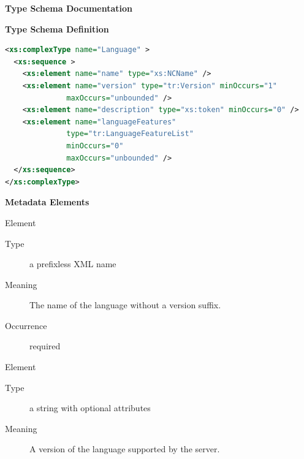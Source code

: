 \documentclass{ivoa}
\begin{document}
\begin{generated}
\begingroup
      	\renewcommand*\descriptionlabel[1]{%
      	\hbox to 5.5em{\emph{#1}\hfil}}\vspace{2ex}\noindent\textbf{ Type Schema Documentation}



\vspace{1ex}\noindent\textbf{ Type Schema Definition}

\begin{lstlisting}[language=XML,basicstyle=\footnotesize]
<xs:complexType name="Language" >
  <xs:sequence >
    <xs:element name="name" type="xs:NCName" />
    <xs:element name="version" type="tr:Version" minOccurs="1"
              maxOccurs="unbounded" />
    <xs:element name="description" type="xs:token" minOccurs="0" />
    <xs:element name="languageFeatures"
              type="tr:LanguageFeatureList"
              minOccurs="0"
              maxOccurs="unbounded" />
  </xs:sequence>
</xs:complexType>
\end{lstlisting}

\vspace{0.5ex}\noindent\textbf{ Metadata Elements}

\begingroup\small\begin{bigdescription}\item[Element \xmlel{name}]
\begin{description}
\item[Type] a prefixless XML name
\item[Meaning] 
          The name of the language without a version suffix.
          
\item[Occurrence] required

\end{description}
\item[Element \xmlel{version}]
\begin{description}
\item[Type] a string with optional attributes
\item[Meaning] 
            A version of the language supported by the server.
          

\end{description}
\end{bigdescription}
\end{generated}
\end{document}
